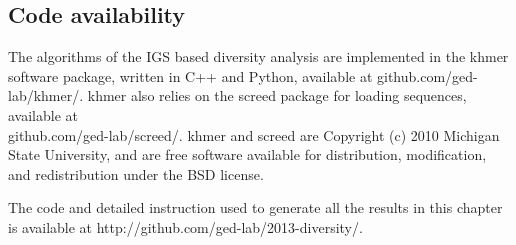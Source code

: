 \subsection{Code availability}
The algorithms of the IGS based diversity analysis are implemented 
 in the khmer software
package, written in C++ and Python, available at github.com/ged-lab/khmer/.
 khmer also relies on the screed package for loading
sequences, available at \\
github.com/ged-lab/screed/.
khmer and screed are Copyright (c) 2010 Michigan State University, and are free
software available for distribution, modification, and redistribution under the
BSD license.

The code and detailed instruction used to generate all the results in this 
chapter is available at
http://github.com/ged-lab/2013-diversity/. 


